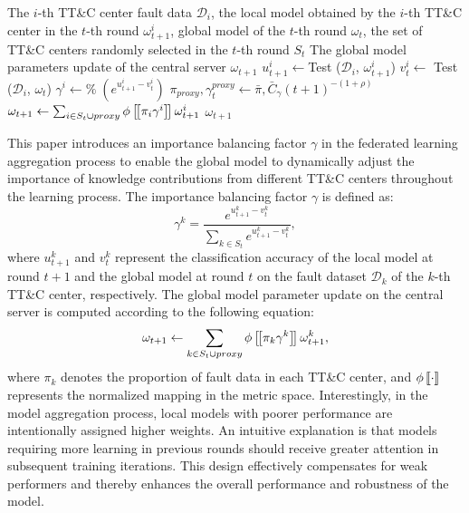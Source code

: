 \begin{algorithm}[t]
	\caption{Dynamic Weighting Method}
	\label{Alg:Dynamic Weighting Method}
	\begin{algorithmic}[1]
		\REQUIRE The $i$-th TT\&C center fault data ${{\mathscr D}_{i}}$, the local model obtained by the $i$-th TT\&C center in the $t$-th round $\omega _{t + 1}^i$, global model of the $t$-th round ${\omega _t}$, the set of TT\&C centers randomly selected in the $t$-th round ${S_t}$
		\ENSURE The global model parameters update of the central server ${\omega _{t + 1}}$
		\STATE $u_{t + 1}^i \leftarrow $Test (${{\mathscr D}_{i}}$, $\omega _{t + 1}^i$)
		\STATE $v_t^i \leftarrow $ Test (${{\mathscr D}_{i}}$, ${\omega _t}$)
		\STATE ${\gamma ^i} \leftarrow \% \; ({{e^{u_{t + 1}^i - v_t^i}}})  $
		\STATE ${\pi _{proxy}},{\gamma _t^{proxy}} \leftarrow \bar \pi ,\bar C_{\gamma}(t+1)^{-(1+\rho )}$
		\STATE ${\omega _{t + 1}} \leftarrow \sum\nolimits_{i \in {S_t} \cup proxy} {\phi \left[\kern-0.15em\left[ {{\pi _i}{\gamma ^i}}  \right]\kern-0.15em\right]\omega _{t + 1}^i} $
		\RETURN ${\omega _{t + 1}}$
	\end{algorithmic}
\end{algorithm}

This paper introduces an importance balancing factor $\gamma$ in the federated learning aggregation process 
to enable the global model to dynamically adjust the importance of knowledge contributions from different TT\&C centers throughout the learning process. 
The importance balancing factor $\gamma$ is defined as:
\begin{equation}
	{\gamma ^k} = \frac{{{e^{u_{t + 1}^k - v_t^k}}}}{{\sum\nolimits_{k \in {S_t}} {{e^{u_{t + 1}^k - v_t^k}}} }},
\end{equation}
\noindent where $u_{t + 1}^k$ and $v_t^k$ represent the classification accuracy of the local model at round $t + 1$ and the global model at round $t$ on the fault dataset ${{\mathscr D}_{k}}$ of the $k$-th TT\&C center, respectively. The global model parameter update on the central server is computed according to the following equation:
\begin{equation}
	{\omega _{t + 1}} \leftarrow \sum_{k \in {S_t} \cup proxy} {\phi \left[\kern-0.15em\left[ {{\pi _k}{\gamma ^k}} 
		\right]\kern-0.15em\right]\omega _{t + 1}^k} ,
\end{equation}
\noindent where ${\pi _k}$ denotes the proportion of fault data in each TT\&C center, 
and $\phi \left[\kern-0.15em\left[ \cdot \right]\kern-0.15em\right]$ represents the normalized mapping in the metric space.
Interestingly, in the model aggregation process, 
local models with poorer performance are intentionally assigned higher weights. 
An intuitive explanation is that models requiring more learning in previous rounds 
should receive greater attention in subsequent training iterations. 
This design effectively compensates for weak performers 
and thereby enhances the overall performance and robustness of the model.

